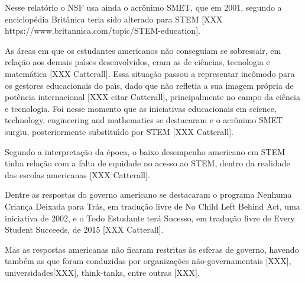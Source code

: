 \documentclass[
12pt,		%
openright,	%
twoside,  %
a4paper,			%
chapter=TITLE,		%
english,			%
french,				%
spanish,			%
brazil				%
]{USPSC-classe/USPSC}
\begin{document}
Nesse relat\'orio o NSF usa ainda o acr\^onimo SMET, que em 2001, segundo a enciclop\'edia Brit\^anica teria sido alterado para STEM [XXX https://www.britannica.com/topic/STEM-education].










As \'areas em que os estudantes americanos n\~ao conseguiam se sobressair, em rela\c{c}\~ao aos demais pa\'{\i}ses desenvolvidos, eram as de ci\^encias, tecnologia e matem\'atica [XXX Catterall]. Essa situa\c{c}\~ao passou a representar inc\^omodo para os gestores educacionais do pa\'{\i}s, dado que n\~ao refletia a sua imagem pr\'opria de pot\^encia internacional [XXX citar Catterall], principalmente no campo da ci\^encia e tecnologia. Foi nesse momento que as iniciativas educacionais em \textquotedbl science, technology, engineering and mathematics se destacaram e o acr\^onimo SMET surgiu, posteriormente substitu\'{\i}do por STEM [XXX  Catterall].










Segundo a interpreta\c{c}\~ao da \'epoca, o baixo desempenho americano em STEM tinha rela\c{c}\~ao com a falta de equidade no acesso ao STEM, dentro da realidade das escolas americanas [XXX Catterall].










Dentre as respostas do governo americano se destacaram o programa \textquotedbl Nenhuma Crian\c{c}a Deixada para Tr\'as, em tradu\c{c}\~ao livre de \textquotedbl No Child Left Behind Act, uma iniciativa de 2002, e o \textquotedbl Todo Estudante ter\'a Sucesso, em tradu\c{c}\~ao livre de \textquotedbl Every Student Succeeds, de 2015 [XXX Catterall].










Mas as respostas americanas n\~ao ficaram restritas \`as esferas de governo, havendo tamb\'em as que foram conduzidas por organiza\c{c}\~oes n\~ao-governamentais [XXX], universidades[XXX], think-tanks, entre outras [XXX].
\end{document}
